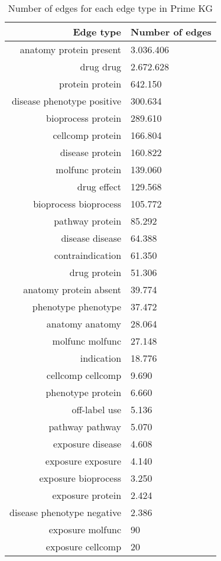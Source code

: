 \begin{table}
    \centering
    \begin{tabular}{rl}
        \toprule
        \textbf{Edge type} & \textbf{Number of edges}\\
        \midrule
        anatomy protein present & 3.036.406 \\
        drug drug & 2.672.628 \\
        protein protein & 642.150 \\
        disease phenotype positive & 300.634 \\
        bioprocess protein & 289.610 \\
        cellcomp protein & 166.804 \\
        disease protein & 160.822 \\
        molfunc protein & 139.060 \\
        drug effect & 129.568 \\
        bioprocess bioprocess & 105.772 \\
        pathway protein & 85.292 \\
        disease disease & 64.388 \\
        contraindication & 61.350 \\
        drug protein & 51.306 \\
        anatomy protein absent & 39.774 \\
        phenotype phenotype & 37.472 \\
        anatomy anatomy & 28.064 \\
        molfunc molfunc & 27.148 \\
        indication & 18.776 \\
        cellcomp cellcomp & 9.690 \\
        phenotype protein & 6.660 \\
        off-label use & 5.136 \\
        pathway pathway & 5.070 \\
        exposure disease & 4.608 \\
        exposure exposure & 4.140 \\
        exposure bioprocess & 3.250 \\
        exposure protein & 2.424 \\
        disease phenotype negative & 2.386 \\
        exposure molfunc & 90 \\
        exposure cellcomp & 20 \\
        \bottomrule
    \end{tabular}
    \caption{Number of edges for each edge type in Prime KG}\label{tab:primekg_edge_types}
\end{table}